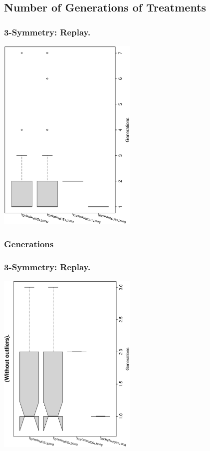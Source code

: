 \documentclass[18pt,c]{beamer}
\begin{document}
\subsection{Number of Generations of Treatments}
 \begin{frame}
 \frametitle{ 3-Symmetry: Replay.  }
 \begin{center}
\includegraphics[width=0.5\textwidth, angle=-90]
{ExpCboxplottGenerations000.eps}
 \end{center}
 \label{ExpCboxplottGenerations000.eps}  
 \end{frame}

 \begin{frame}
 \fontsize{8pt}{9pt}\selectfont
 \frametitle{ Generations }

 \label{ExpCStatsTable002.tex}  
 \end{frame}

 \begin{frame}
 \frametitle{ 3-Symmetry: Replay.  }
 \begin{center}
\includegraphics[width=0.5\textwidth, angle=-90]
{ExpCboxplottGenerations001.eps}
 \end{center}
 \label{ExpCboxplottGenerations001.eps}  
 \end{frame}
\end{document}
